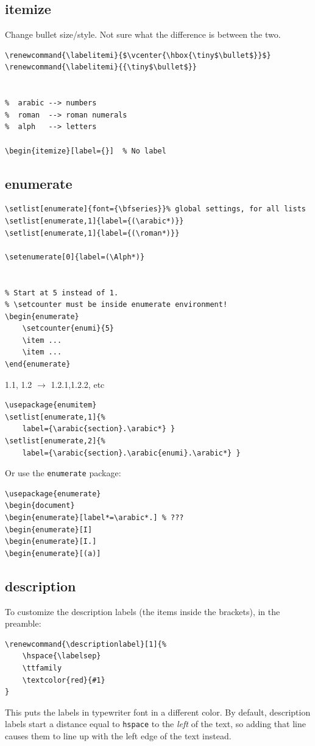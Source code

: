 \documentclass{article}
\renewcommand{\labelitemi}{$\vcenter{\hbox{\tiny$\bullet$}}$}
\renewcommand{\descriptionlabel}[1]{%
    \ttfamily\textcolor{cadet}{#1}
}
\begin{document}
\subsection{itemize}
Change bullet size/style. Not sure what the difference is between the two.
\begin{lstlisting}
\renewcommand{\labelitemi}{$\vcenter{\hbox{\tiny$\bullet$}}$}
\renewcommand{\labelitemi}{{\tiny$\bullet$}}


%  arabic --> numbers
%  roman  --> roman numerals
%  alph   --> letters

\begin{itemize}[label={}]  % No label
\end{lstlisting}

\subsection{enumerate}
\begin{lstlisting}
\setlist[enumerate]{font={\bfseries}}% global settings, for all lists
\setlist[enumerate,1]{label={(\arabic*)}}
\setlist[enumerate,1]{label={(\roman*)}}

\setenumerate[0]{label=(\Alph*)}


% Start at 5 instead of 1.
% \setcounter must be inside enumerate environment!
\begin{enumerate}
    \setcounter{enumi}{5}
    \item ...
    \item ...
\end{enumerate}
\end{lstlisting}

1.1, 1.2 $\rightarrow$ 1.2.1,1.2.2, etc
\begin{lstlisting}
\usepackage{enumitem}
\setlist[enumerate,1]{%
    label={\arabic{section}.\arabic*} }
\setlist[enumerate,2]{%
    label={\arabic{section}.\arabic{enumi}.\arabic*} }
\end{lstlisting}
Or use the \texttt{enumerate} package:
\begin{lstlisting}
\usepackage{enumerate}
\begin{document}
\begin{enumerate}[label*=\arabic*.] % ???
\begin{enumerate}[I]
\begin{enumerate}[I.]
\begin{enumerate}[(a)]
\end{lstlisting}

\subsection{description}
To customize the description labels (the items inside the brackets), in the preamble:
\begin{lstlisting}
\renewcommand{\descriptionlabel}[1]{%
    \hspace{\labelsep}
    \ttfamily
    \textcolor{red}{#1}
}
\end{lstlisting}
This puts the labels in typewriter font in a different color.
By default, description labels start a distance equal to
\texttt{hspace} to the \emph{left} of the text, so adding that line
causes them to line up with the left edge of the text instead.
\end{document}
